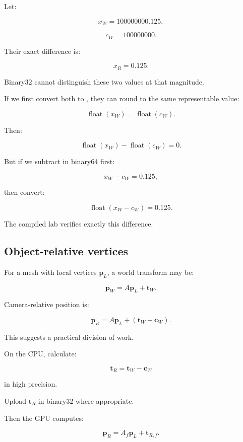 \hypertarget{02-foundations-ii-ch036-numerical-demonstration}{}

Let:

\[
 x_W=100000000.125,
\]

\[
 c_W=100000000.
\]

Their exact difference is:

\[
 \boxed{x_R=0.125}.
\]

Binary32 cannot distinguish these two values at that magnitude.

If we first convert both to , they can round to the same representable value:

\[
 \operatorname{float}(x_W) = \operatorname{float}(c_W).
\]

Then:

\[
 \boxed{ \operatorname{float}(x_W) - \operatorname{float}(c_W)=0 }.
\]

But if we subtract in binary64 first:

\[
 x_W-c_W=0.125,
\]

then convert:

\[
 \boxed{ \operatorname{float}(x_W-c_W)=0.125 }.
\]

The compiled lab verifies exactly this difference.

\subsection{Object-relative vertices}\label{02-foundations-ii-ch036-object-relative-vertices}

\hypertarget{02-foundations-ii-ch036-object-relative-vertices}{}

For a mesh with local vertices \(\mathbf p_L\), a world transform may be:

\[
 \mathbf p_W=A\mathbf p_L+\mathbf t_W.
\]

Camera-relative position is:

\[
 \mathbf p_R= A\mathbf p_L+(\mathbf t_W-\mathbf c_W).
\]

This suggests a practical division of work.

On the CPU, calculate:

\[
 \boxed{ \mathbf t_R=\mathbf t_W-\mathbf c_W }
\]

in high precision.

Upload \(\mathbf t_R\) in binary32 where appropriate.

Then the GPU computes:

\[
 \boxed{ \mathbf p_R=A_f\mathbf p_L+\mathbf t_{R,f} }.
\]

